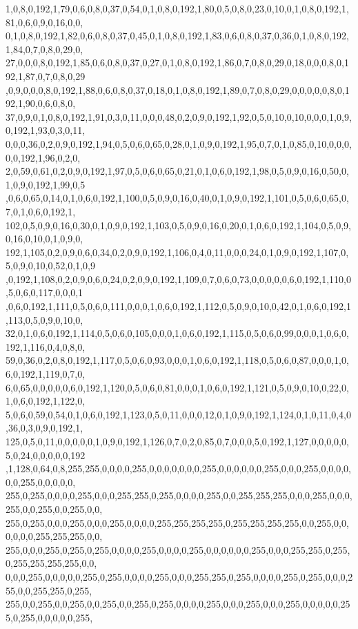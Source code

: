 \begin{DoxyCode}
      1,0,8,0,192,1,79,0,6,0,8,0,37,0,54,0,1,0,8,0,192,1,80,0,5,0,8,0,23,0,10,0,1,0,8,0,192,1,81,0,6,0,9,0,16,0,0,
      0,1,0,8,0,192,1,82,0,6,0,8,0,37,0,45,0,1,0,8,0,192,1,83,0,6,0,8,0,37,0,36,0,1,0,8,0,192,1,84,0,7,0,8,0,29,0,
      27,0,0,0,8,0,192,1,85,0,6,0,8,0,37,0,27,0,1,0,8,0,192,1,86,0,7,0,8,0,29,0,18,0,0,0,8,0,192,1,87,0,7,0,8,0,29
      ,0,9,0,0,0,8,0,192,1,88,0,6,0,8,0,37,0,18,0,1,0,8,0,192,1,89,0,7,0,8,0,29,0,0,0,0,0,8,0,192,1,90,0,6,0,8,0,
      37,0,9,0,1,0,8,0,192,1,91,0,3,0,11,0,0,0,48,0,2,0,9,0,192,1,92,0,5,0,10,0,10,0,0,0,1,0,9,0,192,1,93,0,3,0,11,
      0,0,0,36,0,2,0,9,0,192,1,94,0,5,0,6,0,65,0,28,0,1,0,9,0,192,1,95,0,7,0,1,0,85,0,10,0,0,0,0,0,192,1,96,0,2,0,
      2,0,59,0,61,0,2,0,9,0,192,1,97,0,5,0,6,0,65,0,21,0,1,0,6,0,192,1,98,0,5,0,9,0,16,0,50,0,1,0,9,0,192,1,99,0,5
      ,0,6,0,65,0,14,0,1,0,6,0,192,1,100,0,5,0,9,0,16,0,40,0,1,0,9,0,192,1,101,0,5,0,6,0,65,0,7,0,1,0,6,0,192,1,
      102,0,5,0,9,0,16,0,30,0,1,0,9,0,192,1,103,0,5,0,9,0,16,0,20,0,1,0,6,0,192,1,104,0,5,0,9,0,16,0,10,0,1,0,9,0,
      192,1,105,0,2,0,9,0,6,0,34,0,2,0,9,0,192,1,106,0,4,0,11,0,0,0,24,0,1,0,9,0,192,1,107,0,5,0,9,0,10,0,52,0,1,0,9
      ,0,192,1,108,0,2,0,9,0,6,0,24,0,2,0,9,0,192,1,109,0,7,0,6,0,73,0,0,0,0,0,6,0,192,1,110,0,5,0,6,0,117,0,0,0,1
      ,0,6,0,192,1,111,0,5,0,6,0,111,0,0,0,1,0,6,0,192,1,112,0,5,0,9,0,10,0,42,0,1,0,6,0,192,1,113,0,5,0,9,0,10,0,
      32,0,1,0,6,0,192,1,114,0,5,0,6,0,105,0,0,0,1,0,6,0,192,1,115,0,5,0,6,0,99,0,0,0,1,0,6,0,192,1,116,0,4,0,8,0,
      59,0,36,0,2,0,8,0,192,1,117,0,5,0,6,0,93,0,0,0,1,0,6,0,192,1,118,0,5,0,6,0,87,0,0,0,1,0,6,0,192,1,119,0,7,0,
      6,0,65,0,0,0,0,0,6,0,192,1,120,0,5,0,6,0,81,0,0,0,1,0,6,0,192,1,121,0,5,0,9,0,10,0,22,0,1,0,6,0,192,1,122,0,
      5,0,6,0,59,0,54,0,1,0,6,0,192,1,123,0,5,0,11,0,0,0,12,0,1,0,9,0,192,1,124,0,1,0,11,0,4,0,36,0,3,0,9,0,192,1,
      125,0,5,0,11,0,0,0,0,0,1,0,9,0,192,1,126,0,7,0,2,0,85,0,7,0,0,0,5,0,192,1,127,0,0,0,0,0,5,0,24,0,0,0,0,0,192
      ,1,128,0,64,0,8,255,255,0,0,0,0,255,0,0,0,0,0,0,0,255,0,0,0,0,0,0,255,0,0,0,255,0,0,0,0,0,0,255,0,0,0,0,0,
      255,0,255,0,0,0,0,255,0,0,0,255,255,0,255,0,0,0,0,255,0,0,255,255,255,0,0,0,255,0,0,0,255,0,0,255,0,0,255,0,0,
      255,0,255,0,0,0,255,0,0,0,255,0,0,0,0,255,255,255,255,0,255,255,255,255,0,0,255,0,0,0,0,0,0,255,255,255,0,0,
      255,0,0,0,255,0,255,0,255,0,0,0,0,255,0,0,0,0,255,0,0,0,0,0,0,255,0,0,0,255,255,0,255,0,255,255,255,255,0,0,
      0,0,0,255,0,0,0,0,0,255,0,255,0,0,0,0,255,0,0,0,255,255,0,255,0,0,0,0,255,0,255,0,0,0,255,0,0,255,255,0,255,
      255,0,0,255,0,0,255,0,0,255,0,0,255,0,255,0,0,0,0,255,0,0,0,255,0,0,0,255,0,0,0,0,0,255,0,255,0,0,0,0,0,255,

\end{DoxyCode}
